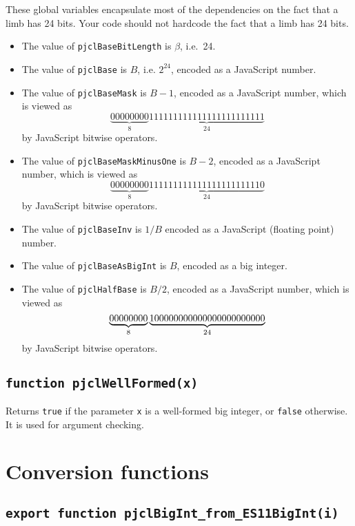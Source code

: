 \documentclass[12pt]{article}
\begin{document}
These global variables encapsulate most of the dependencies on the
fact that a limb has 24 bits.  Your code should not hardcode the fact
that a limb has 24 bits.
\begin{itemize}

\item The value of {\tt pjclBaseBitLength} is $\beta$, i.e.\ 24.

\item The value of {\tt pjclBase} is $B$, i.e. $2^{24}$, encoded as a JavaScript number.

\item The value of {\tt pjclBaseMask} is $B-1$, encoded as a JavaScript number,
which is viewed as
$$
\underbrace{00000000}_8\underbrace{111111111111111111111111}_{24}
$$
by JavaScript bitwise operators.

\item The value of {\tt pjclBaseMaskMinusOne} is $B-2$, encoded as a JavaScript number,
which is viewed as
$$
\underbrace{00000000}_8\underbrace{111111111111111111111110}_{24}
$$
by JavaScript bitwise operators.

\item The value of {\tt pjclBaseInv} is $1/B$ encoded as a JavaScript (floating point) number.

\item The value of {\tt pjclBaseAsBigInt} is $B$, encoded as a big integer.

\item The value of {\tt pjclHalfBase} is $B/2$, encoded as a JavaScript number,
which is viewed as
$$
\underbrace{00000000}_8\underbrace{100000000000000000000000\tt }_{24}
$$
by JavaScript bitwise operators.

\end{itemize}

\subsection{\tt function pjclWellFormed(x)}

Returns {\tt true} if the parameter {\tt x} is a well-formed big
integer, or {\tt false} otherwise.  It is used for argument checking.

\section{Conversion functions}

\subsection{\tt export function pjclBigInt_from_ES11BigInt(i)}
\end{document}

